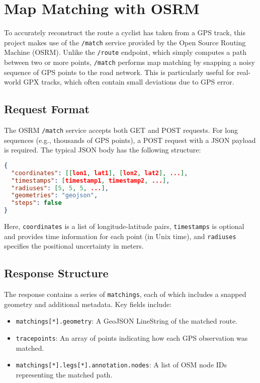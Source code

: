 \documentclass[12pt,a4paper]{report}
\begin{document}
\section{Map Matching with OSRM}

To accurately reconstruct the route a cyclist has taken from a GPS track, this project makes use of the \texttt{/match} service provided by the Open Source Routing Machine (OSRM). Unlike the \texttt{/route} endpoint, which simply computes a path between two or more points, \texttt{/match} performs map matching by snapping a noisy sequence of GPS points to the road network. This is particularly useful for real-world GPX tracks, which often contain small deviations due to GPS error.

\subsection{Request Format}

The OSRM \texttt{/match} service accepts both GET and POST requests. For long sequences (e.g., thousands of GPS points), a POST request with a JSON payload is required. The typical JSON body has the following structure:

\begin{lstlisting}[language=json]
{
  "coordinates": [[lon1, lat1], [lon2, lat2], ...],
  "timestamps": [timestamp1, timestamp2, ...],
  "radiuses": [5, 5, 5, ...],
  "geometries": "geojson",
  "steps": false
}
\end{lstlisting}

Here, \texttt{coordinates} is a list of longitude-latitude pairs, \texttt{timestamps} is optional and provides time information for each point (in Unix time), and \texttt{radiuses} specifies the positional uncertainty in meters.

\subsection{Response Structure}

The response contains a series of \texttt{matchings}, each of which includes a snapped geometry and additional metadata. Key fields include:

\begin{itemize}
    \item \texttt{matchings[*].geometry}: A GeoJSON LineString of the matched route.
    \item \texttt{tracepoints}: An array of points indicating how each GPS observation was matched.
    \item \texttt{matchings[*].legs[*].annotation.nodes}: A list of OSM node IDs representing the matched path.
\end{itemize}
\end{document}
